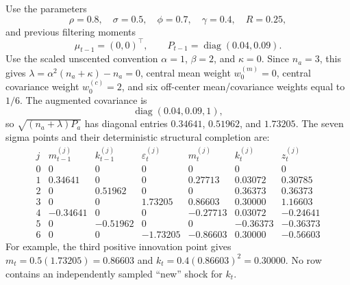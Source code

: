 Use the parameters
\[
  \rho=0.8,\quad \sigma=0.5,\quad \phi=0.7,\quad
  \gamma=0.4,\quad R=0.25,
\]
and previous filtering moments
\[
  \mu_{t-1}=(0,0)^\top,
  \qquad
  P_{t-1}=\operatorname{diag}(0.04,0.09).
\]
Use the scaled unscented convention $\alpha=1$, $\beta=2$, and $\kappa=0$.
Since $n_a=3$, this gives $\lambda=\alpha^2(n_a+\kappa)-n_a=0$, central mean
weight $w_0^{(m)}=0$, central covariance weight $w_0^{(c)}=2$, and six
off-center mean/covariance weights equal to $1/6$.
The augmented covariance is
\[
  \operatorname{diag}(0.04,0.09,1),
\]
so $\sqrt{(n_a+\lambda)P_a}$ has diagonal entries
$0.34641$, $0.51962$, and $1.73205$.  The seven sigma points and their
deterministic structural completion are:
\[
\begin{array}{c|rrr|rrr}
  j
  & m_{t-1}^{(j)} & k_{t-1}^{(j)} & \varepsilon_t^{(j)}
  & m_t^{(j)} & k_t^{(j)} & z_t^{(j)}\\
  \hline
  0 & 0       & 0        & 0        & 0        & 0        & 0\\
  1 & 0.34641& 0        & 0        & 0.27713 & 0.03072 & 0.30785\\
  2 & 0      & 0.51962  & 0        & 0       & 0.36373 & 0.36373\\
  3 & 0      & 0        & 1.73205  & 0.86603 & 0.30000 & 1.16603\\
  4 & -0.34641& 0       & 0        & -0.27713& 0.03072 & -0.24641\\
  5 & 0      & -0.51962 & 0        & 0       & -0.36373& -0.36373\\
  6 & 0      & 0        & -1.73205 & -0.86603& 0.30000 & -0.56603
\end{array}
\]
For example, the third positive innovation point gives
$m_t=0.5(1.73205)=0.86603$ and
$k_t=0.4(0.86603)^2=0.30000$.  No row contains an independently sampled
``new'' shock for $k_t$.

